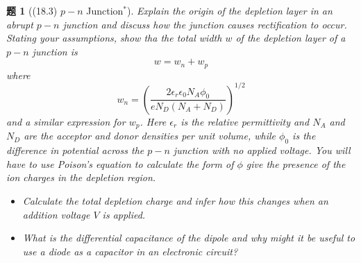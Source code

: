 \documentclass[UTF8,10pt,a4paper]{article}
\theoremstyle{Problem}
\newtheorem{prob}{题}
\theoremstyle{Solution}
\begin{document}
\begin{prob}[(18.3) $p-n$ Junction$^*$]
    Explain the origin of the depletion layer in an abrupt $p-n$ junction and discuss how the junction causes rectification to occur. Stating your assumptions, show tha the total width $w$ of the depletion layer of a $p-n$ junction is
    \[
        w=w_n+w_p
    \]
    where
    \[
        w_n=\left(\frac{2\epsilon_r\epsilon_0N_A\phi_0}{eN_D(N_A+N_D)}\right)^{1/2}
    \]
    and a similar expression for $w_p$. Here $\epsilon_r$ is the relative permittivity and $N_A$ and $N_D$ are the acceptor and donor densities per unit volume, while $\phi_0$ is the difference in potential across the $p-n$ junction with no applied voltage. You will have to use Poison's equation to calculate the form of $\phi$ give the presence of the ion charges in the depletion region.
    \begin{itemize}
        \item[$\triangleright$] Calculate the total depletion charge and infer how this changes when an addition voltage $V$ is applied.
        \item[$\triangleright$] What is the differential capacitance of the dipole and why might it be useful to use a diode as a capacitor in an electronic circuit?
    \end{itemize}
\end{prob}
\end{document}
